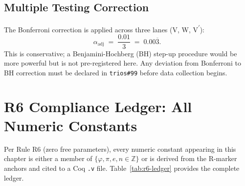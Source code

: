 \subsection{Multiple Testing Correction}

The Bonferroni correction is applied across three lanes
(V, W, V\textsuperscript{$'$}):
%
\begin{equation}
  \label{eq:bonferroni}
  \alpha_{\text{adj}} \;=\; \frac{0.01}{3} \;=\; 0.00\overline{3}.
\end{equation}
%
This is conservative; a Benjamini-Hochberg (BH) step-up procedure would be
more powerful but is not pre-registered here.
Any deviation from Bonferroni to BH correction must be declared in
\texttt{trios\#99} before data collection begins.



\section{R6 Compliance Ledger: All Numeric Constants}
\label{sec:flos77-r6-ledger}

Per Rule R6 (zero free parameters), every numeric constant appearing in this
chapter is either a member of $\{\varphi, \pi, e, n \in \mathbb{Z}\}$ or
is derived from the R-marker anchors and cited to a Coq \texttt{.v} file.
Table~\ref{tab:r6-ledger} provides the complete ledger.

